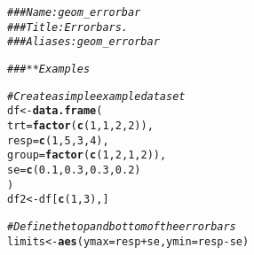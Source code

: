 \documentclass[a4paper,titlepage]{tufte-handout}\usepackage[]{graphicx}\usepackage[]{color}
\makeatletter
\newcommand{\hlnum}[1]{\textcolor[rgb]{0.686,0.059,0.569}{#1}}%
\newcommand{\hlcom}[1]{\textcolor[rgb]{0.678,0.584,0.686}{\textit{#1}}}%
\newcommand{\hlopt}[1]{\textcolor[rgb]{0,0,0}{#1}}%
\newcommand{\hlstd}[1]{\textcolor[rgb]{0.345,0.345,0.345}{#1}}%
\newcommand{\hlkwb}[1]{\textcolor[rgb]{0.69,0.353,0.396}{#1}}%
\newcommand{\hlkwc}[1]{\textcolor[rgb]{0.333,0.667,0.333}{#1}}%
\newcommand{\hlkwd}[1]{\textcolor[rgb]{0.737,0.353,0.396}{\textbf{#1}}}%
\newenvironment{kframe}{%
 \def\at@end@of@kframe{}%
 \ifinner\ifhmode%
  \def\at@end@of@kframe{\end{minipage}}%
  \begin{minipage}{\columnwidth}%
 \fi\fi%
 \def\FrameCommand##1{\hskip\@totalleftmargin \hskip-\fboxsep
 \colorbox{shadecolor}{##1}\hskip-\fboxsep
     \hskip-\linewidth \hskip-\@totalleftmargin \hskip\columnwidth}%
 \MakeFramed {\advance\hsize-\width
   \@totalleftmargin\z@ \linewidth\hsize
   \@setminipage}}%
 {\par\unskip\endMakeFramed%
 \at@end@of@kframe}
\newenvironment{knitrout}{}{} %
\makeatother
\begin{document}
\begin{knitrout}
\color{fgcolor}\begin{kframe}
\begin{alltt}
\hlcom{### Name: geom_errorbar}
\hlcom{### Title: Error bars.}
\hlcom{### Aliases: geom_errorbar}

\hlcom{### ** Examples}

\hlcom{# Create a simple example dataset}
\hlstd{df} \hlkwb{<-} \hlkwd{data.frame}\hlstd{(}
  \hlkwc{trt} \hlstd{=} \hlkwd{factor}\hlstd{(}\hlkwd{c}\hlstd{(}\hlnum{1}\hlstd{,} \hlnum{1}\hlstd{,} \hlnum{2}\hlstd{,} \hlnum{2}\hlstd{)),}
  \hlkwc{resp} \hlstd{=} \hlkwd{c}\hlstd{(}\hlnum{1}\hlstd{,} \hlnum{5}\hlstd{,} \hlnum{3}\hlstd{,} \hlnum{4}\hlstd{),}
  \hlkwc{group} \hlstd{=} \hlkwd{factor}\hlstd{(}\hlkwd{c}\hlstd{(}\hlnum{1}\hlstd{,} \hlnum{2}\hlstd{,} \hlnum{1}\hlstd{,} \hlnum{2}\hlstd{)),}
  \hlkwc{se} \hlstd{=} \hlkwd{c}\hlstd{(}\hlnum{0.1}\hlstd{,} \hlnum{0.3}\hlstd{,} \hlnum{0.3}\hlstd{,} \hlnum{0.2}\hlstd{)}
\hlstd{)}
\hlstd{df2} \hlkwb{<-} \hlstd{df[}\hlkwd{c}\hlstd{(}\hlnum{1}\hlstd{,}\hlnum{3}\hlstd{),]}

\hlcom{# Define the top and bottom of the errorbars}
\hlstd{limits} \hlkwb{<-} \hlkwd{aes}\hlstd{(}\hlkwc{ymax} \hlstd{= resp} \hlopt{+} \hlstd{se,} \hlkwc{ymin}\hlstd{=resp} \hlopt{-} \hlstd{se)}


\end{alltt}
\end{kframe}
\end{knitrout}
\end{document}
